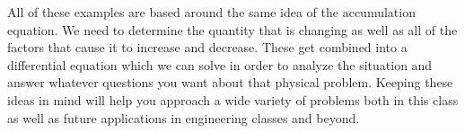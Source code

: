 \documentclass{ximera}
\begin{document}
All of these examples are based around the same idea of the accumulation equation. We need to determine the quantity that is changing as well as all of the factors that cause it to increase and decrease. These get combined into a differential equation which we can solve in order to analyze the situation and answer whatever questions you want about that physical problem. Keeping these ideas in mind will help you approach a wide variety of problems both in this class as well as future applications  in engineering classes and beyond.
\end{document}
